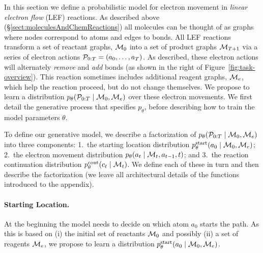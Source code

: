 


In this section we define a probabilistic model for electron movement in \emph{linear electron flow} (LEF) reactions.
As described above (\S \ref{sect:moleculesAndChemReactions}) all molecules can be thought of as graphs where nodes correspond to atoms and edges to bonds. All LEF reactions transform a set of reactant graphs, ${\mathcal{M}}_0$ into a set of product graphs ${\mathcal{M}}_{T+1}$ via a series of electron actions ${\mathcal{P}}_{0:T} = (a_0, \dots, a_{T})$.  As described, these electron actions will alternately \emph{remove} and \emph{add} bonds (as shown in the right of Figure~\ref{fig:task-overview}). This reaction sometimes includes additional reagent graphs, ${\mathcal{M}}_e$, which help the reaction proceed, but do not change themselves.
We propose to learn a distribution $p_\theta( {\mathcal{P}}_{0:T} \mid {\mathcal{M}}_0, {\mathcal{M}}_e)$ over these electron movements. 
We first detail the generative process %
that specifies $p_\theta$, before describing how to train the model parameters $\theta$.




To define our generative model, we describe a factorization of $p_\theta( {\mathcal{P}}_{0:T} \mid {\mathcal{M}}_0, {\mathcal{M}}_e)$ into three components: 1.\ the starting location distribution $p_\theta^{\mathrm{start}}(a_0 \mid {\mathcal{M}}_0, {\mathcal{M}}_e)$; 2.\ the electron movement distribution $p_\theta(a_t \mid {\mathcal{M}}_{t}, a_{t-1}, t)$; and 3.\ the reaction continuation distribution $p^\textrm{cont}_\theta(c_{t} \mid {\mathcal{M}}_{t})$. We define each of these in turn and then describe the factorization (we leave all architectural details of the functions introduced to the appendix).

\paragraph{Starting Location.}
At the beginning the model needs to decide on which atom $a_0$ starts the path.
As this is based on (i) the initial set of reactants ${\mathcal{M}}_0$ and possibly (ii) a set of reagents ${\mathcal{M}}_e$,
we propose to learn a distribution $p_\theta^{\mathrm{start}}(a_0 \mid {\mathcal{M}}_0, {\mathcal{M}}_e)$.

